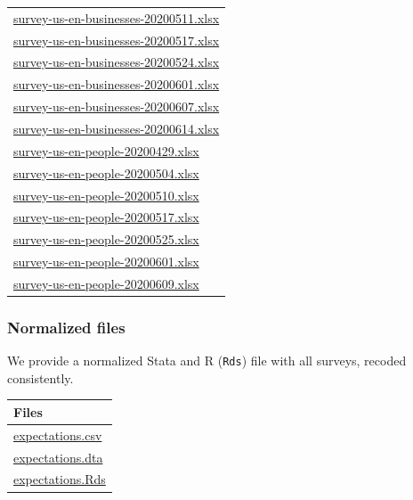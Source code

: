 \documentclass[
]{article}
\begin{document}
\begin{longtable}[]{@{}l@{}}
\href{final/survey-us-en-businesses-20200511.xlsx}{survey-us-en-businesses-20200511.xlsx} \\
\href{final/survey-us-en-businesses-20200517.xlsx}{survey-us-en-businesses-20200517.xlsx} \\
\href{final/survey-us-en-businesses-20200524.xlsx}{survey-us-en-businesses-20200524.xlsx} \\
\href{final/survey-us-en-businesses-20200601.xlsx}{survey-us-en-businesses-20200601.xlsx} \\
\href{final/survey-us-en-businesses-20200607.xlsx}{survey-us-en-businesses-20200607.xlsx} \\
\href{final/survey-us-en-businesses-20200614.xlsx}{survey-us-en-businesses-20200614.xlsx} \\
\href{final/survey-us-en-people-20200429.xlsx}{survey-us-en-people-20200429.xlsx} \\
\href{final/survey-us-en-people-20200504.xlsx}{survey-us-en-people-20200504.xlsx} \\
\href{final/survey-us-en-people-20200510.xlsx}{survey-us-en-people-20200510.xlsx} \\
\href{final/survey-us-en-people-20200517.xlsx}{survey-us-en-people-20200517.xlsx} \\
\href{final/survey-us-en-people-20200525.xlsx}{survey-us-en-people-20200525.xlsx} \\
\href{final/survey-us-en-people-20200601.xlsx}{survey-us-en-people-20200601.xlsx} \\
\href{final/survey-us-en-people-20200609.xlsx}{survey-us-en-people-20200609.xlsx} \\
\bottomrule
\end{longtable}

\hypertarget{normalized-files}{%
\subsubsection{Normalized files}\label{normalized-files}}

We provide a normalized Stata and R (\texttt{Rds}) file with all
surveys, recoded consistently.

\begin{longtable}[]{@{}l@{}}
\toprule
Files \\
\midrule
\endhead
\href{derived/expectations.csv}{expectations.csv} \\
\href{derived/expectations.dta}{expectations.dta} \\
\href{derived/expectations.Rds}{expectations.Rds} \\
\bottomrule
\end{longtable}
\end{document}

